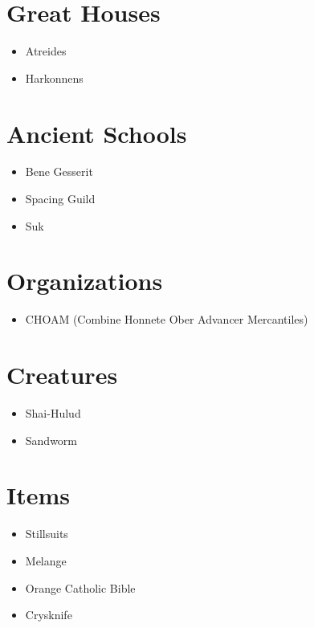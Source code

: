 \documentclass{article}
\begin{document}
\section{Great Houses}
\begin{itemize}
\item Atreides 
\item Harkonnens
\end{itemize}

\section{Ancient Schools}
\begin{itemize}
\item Bene Gesserit 
\item Spacing Guild
\item Suk
\end{itemize}

\section{Organizations}
\begin{itemize}
\item CHOAM (Combine Honnete Ober Advancer Mercantiles)
\end{itemize}

\section{Creatures}
\begin{itemize}
\item Shai-Hulud
\item Sandworm 
\end{itemize}

\section{Items}
\begin{itemize}
\item Stillsuits
\item Melange
\item Orange Catholic Bible
\item Crysknife
\end{itemize}
\end{document}
